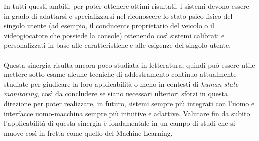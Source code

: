 In tutti questi ambiti, per poter ottenere ottimi risultati, i sistemi devono essere in grado di adattarsi e specializzarsi nel riconoscere lo stato psico-fisico del singolo utente (ad esempio, il conducente proprietario del veicolo o il videogiocatore che possiede la console) ottenendo così sistemi calibrati e personalizzati in base alle caratteristiche e alle esigenze del singolo utente.\\\\
Questa sinergia risulta ancora poco studiata in letteratura, quindi può essere utile mettere sotto esame alcune tecniche di addestramento continuo attualmente studiate per giudicare la loro applicabilità o meno in contesti di \textit{human state monitoring}, così da concludere se siano necessari ulteriori sforzi in questa direzione per poter realizzare, in futuro, sistemi sempre più integrati con l'uomo e interfacce uomo-macchina sempre più intuitive e adattive. Valutare fin da subito l'applicabilità di questa sinergia è fondamentale in un campo di studi che si muove così in fretta come quello del Machine Learning.

